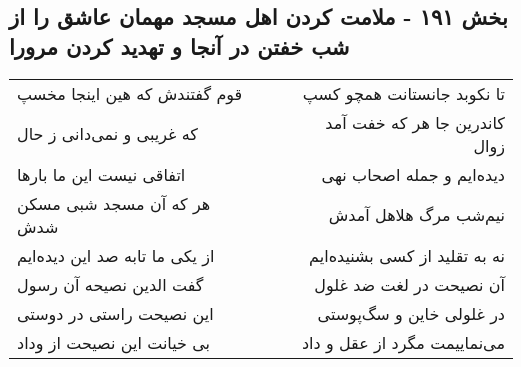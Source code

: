 \begin{center}
\section*{بخش ۱۹۱ - ملامت کردن اهل مسجد مهمان عاشق را از شب خفتن در آنجا و تهدید کردن مرورا}
\label{sec:sh191}
\begin{longtable}{l p{0.5cm} r}
قوم گفتندش که هین اینجا مخسپ
&&
تا نکوبد جانستانت همچو کسپ
\\
که غریبی و نمی‌دانی ز حال
&&
کاندرین جا هر که خفت آمد زوال
\\
اتفاقی نیست این ما بارها
&&
دیده‌ایم و جمله اصحاب نهی
\\
هر که آن مسجد شبی مسکن شدش
&&
نیم‌شب مرگ هلاهل آمدش
\\
از یکی ما تابه صد این دیده‌ایم
&&
نه به تقلید از کسی بشنیده‌ایم
\\
گفت الدین نصیحه آن رسول
&&
آن نصیحت در لغت ضد غلول
\\
این نصیحت راستی در دوستی
&&
در غلولی خاین و سگ‌پوستی
\\
بی خیانت این نصیحت از وداد
&&
می‌نماییمت مگرد از عقل و داد
\\
\end{longtable}
\end{center}
